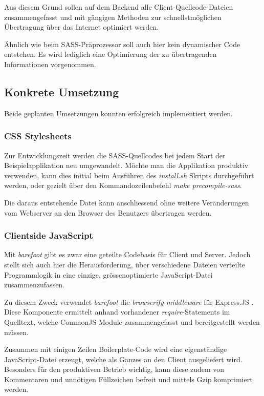 Aus diesem Grund sollen auf dem Backend alle Client-Quellcode-Dateien zusammengefasst und mit gängigen Methoden zur schnellstmöglichen Übertragung über das Internet optimiert werden.

Ähnlich wie beim SASS-Präprozessor soll auch hier kein dynamischer Code entstehen. Es wird lediglich eine Optimierung der zu übertragenden Informationen vorgenommen.


\subsection*{Konkrete Umsetzung}
Beide geplanten Umsetzungen konnten erfolgreich implementiert werden.

\subsubsection*{CSS Stylesheets}
Zur Entwicklungszeit werden die SASS-Quellcodes bei jedem Start der Beispielapplikation neu umgewandelt. Möchte man die Applikation produktiv verwenden, kann dies initial beim Ausführen des \emph{install.sh} Skripts durchgeführt werden, oder gezielt über den Kommandozeilenbefehl \emph{make precompile-sass}.

Die daraus entstehende Datei kann anschliessend ohne weitere Veränderungen vom Webserver an den Browser des Benutzers übertragen werden.

\subsubsection*{Clientside JavaScript}
Mit \emph{barefoot} \cite{Barefoot} gibt es zwar eine geteilte Codebasis für Client und Server. Jedoch stellt sich auch hier die Herausforderung, über verschiedene Dateien verteilte Programmlogik in eine einzige, grössenoptimierte JavaScript-Datei zusammenzufassen.

Zu diesem Zweck verwendet \emph{barefoot} die \emph{browserify-middleware} für Express.JS \cite{browserifymiddleware}. Diese Komponente ermittelt anhand vorhandener \emph{require}-Statements im Quelltext, welche CommonJS Module \cite{commonjsmodules} zusammengefasst und bereitgestellt werden müssen.

Zusammen mit einigen Zeilen \gls{Boilerplate}-Code wird eine eigenständige JavaScript-Datei erzeugt, welche als Ganzes an den Client ausgeliefert wird. Besonders für den produktiven Betrieb wichtig, kann diese zudem von Kommentaren und unnötigen Füllzeichen befreit und mittels Gzip \cite{gzip} komprimiert werden.

